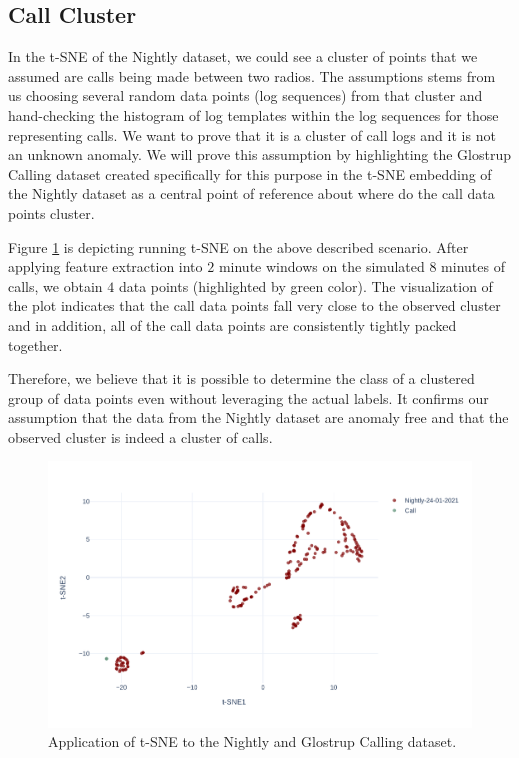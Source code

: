 \subsection{Call Cluster}
In the t-SNE of the Nightly dataset, we could see a cluster of points that we assumed are calls being made between two radios. The assumptions stems from us choosing several random data points (log sequences) from that cluster and hand-checking the histogram of log templates within the log sequences for those representing calls. We want to prove that it is a cluster of call logs and it is not an unknown anomaly. We will prove this assumption by highlighting the Glostrup Calling dataset created specifically for this purpose in the t-SNE embedding of the Nightly dataset as a central point of reference about where do the call data points cluster.

Figure \ref{fig:tsne-nightly-calls} is depicting running t-SNE on the above described scenario. After applying feature extraction into $2$ minute windows on the simulated $8$ minutes of calls, we obtain $4$ data points (highlighted by green color). The visualization of the plot indicates that the call data points fall very close to the observed cluster and in addition, all of the call data points are consistently tightly packed together. 

Therefore, we believe that it is possible to determine the class of a clustered group of data points even without leveraging the actual labels. It confirms our assumption that the data from the Nightly dataset are anomaly free and that the observed cluster is indeed a cluster of calls.

\begin{figure}[h]
    \centering
    \includegraphics[width=\textwidth]{img/tsne-nights-call-comparison.pdf}
    \caption{Application of t-SNE to the Nightly and Glostrup Calling dataset.}
    \label{fig:tsne-nightly-calls}
\end{figure}

